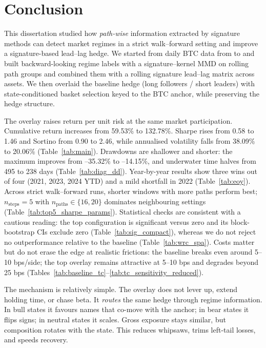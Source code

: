 \chapter{Conclusion}\label{Chapter:Conclusion}

This dissertation studied how \emph{path-wise} information extracted by signature methods can detect market regimes in a strict walk–forward setting and improve a signature-based lead--lag hedge. We started from daily BTC data from \sampleStart{} to\sampleEnd{} and built backward-looking regime labels with a signature–kernel MMD on rolling path groups and combined them with a rolling signature lead--lag matrix across assets. We then overlaid the baseline hedge (long followers / short leaders) with state-conditioned basket selection keyed to the BTC anchor, while preserving the hedge structure.

The overlay raises return per unit risk at the same market participation. Cumulative return increases from 59.53\% to 132.78\%. Sharpe rises from 0.58 to 1.46 and Sortino from 0.90 to 2.46, while annualised volatility falls from 38.09\% to 20.06\% (Table~\ref{tab:main}). Drawdowns are shallower and shorter: the maximum improves from --35.32\% to --14.15\%, and underwater time halves from 495 to 238 days (Table~\ref{tab:diag_dd}). Year-by-year results show three wins out of four (2021, 2023, 2024 YTD) and a mild shortfall in 2022 (Table~\ref{tab:eoy}). Across strict walk–forward runs, shorter windows with more paths perform best; \(n_{\text{steps}}{=}5\) with \(n_{\text{paths}}\in\{16,20\}\) dominates neighbouring settings (Table~\ref{tab:top5_sharpe_params}). Statistical checks are consistent with a cautious reading: the top configuration is significant versus zero and its block-bootstrap CIs exclude zero (Table~\ref{tab:sig_compact}), whereas we do not reject no outperformance relative to the baseline (Table~\ref{tab:wrc_spa}). Costs matter but do not erase the edge at realistic frictions: the baseline breaks even around 5–10 bps/side; the top overlay remains attractive at 5–10 bps and degrades beyond 25 bps (Tables~\ref{tab:baseline_tc}–\ref{tab:tc_sensitivity_reduced}).

The mechanism is relatively simple. The overlay does not lever up, extend holding time, or chase beta. It \emph{routes} the same hedge through regime information. In bull states it favours names that co-move with the anchor; in bear states it flips signs; in neutral states it scales. Gross exposure stays similar, but composition rotates with the state. This reduces whipsaws, trims left-tail losses, and speeds recovery.

